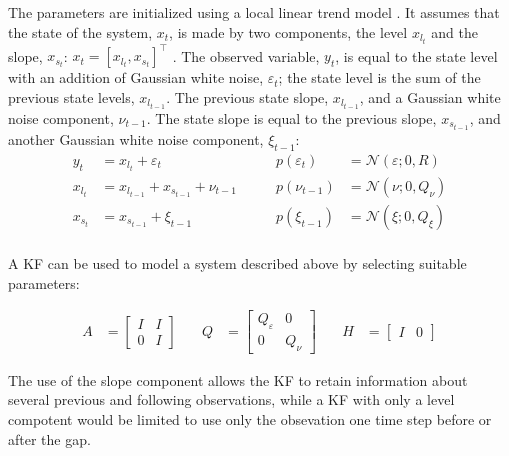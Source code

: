 \documentclass{article}
\newcommand{\norm}[3]{\mathcal{N}\left(#1; #2, #3\right)} %
\begin{document}
The parameters are initialized using a local linear trend model \cite{durbin_time_2012-1}. It assumes that the state of the system, $x_t$, is made by two components, the level $x_{l_t}$ and the slope, $x_{s_t}$: $x_t = [x_{l_t}, x_{s_t}]^\top$ . The observed variable, $y_t$, is equal to the state level with an addition of Gaussian white noise, $\varepsilon_t$; the state level is the sum of the previous state levels, $x_{l_{t-1}}$. The previous state slope, $x_{l_{t-1}}$, and a Gaussian white noise component, $\nu_{t-1}$. The state slope is equal to the previous slope, $x_{s_{t-1}}$, and another Gaussian white noise component, $\xi_{t-1}$:
\begin{equation*}
   \begin{alignedat}{2}
    y_t &= x_{l_t} + \varepsilon_t & p(\varepsilon_t) \quad &= \norm{\varepsilon}{0}{R}\\
    x_{l_t} &= x_{l_{t-1}} + x_{s_{t-1}} + \nu_{t-1} \quad \quad & p(\nu_{t-1}) &= \norm{\nu}{0}{Q_\nu}\\
    x_{s_t} &= x_{s_{t-1}} + \xi_{t-1} \quad & p(\xi_{t-1}) &= \norm{\xi}{0}{Q_\xi} \\
    \end{alignedat} 
\end{equation*}

A KF can be used to model a system described above by selecting suitable parameters:

\begin{equation*}\label{eq:local_slope}
\begin{alignedat}{3}
    A &= \begin{bmatrix}I & I \\ 0 & I\end{bmatrix} \quad & Q &= \begin{bmatrix}Q_\varepsilon & 0 \\ 0 & Q_\nu \end{bmatrix}  \quad & H &= \begin{bmatrix}I & 0 \end{bmatrix}
\end{alignedat} 
\end{equation*}

The use of the slope component allows the KF to retain information about several previous and following observations, while a KF with only a level compotent would be limited to use only the obsevation one time step before or after the gap.
\end{document}

